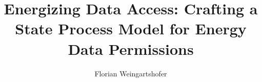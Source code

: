 \documentclass[sigconf]{acmart}
\begin{document}
    \title{Energizing Data Access: Crafting a State Process Model for Energy Data Permissions}

    \author{Florian Weingartshofer}

    

    \maketitle

    
    
    
    

    
    
\end{document}
